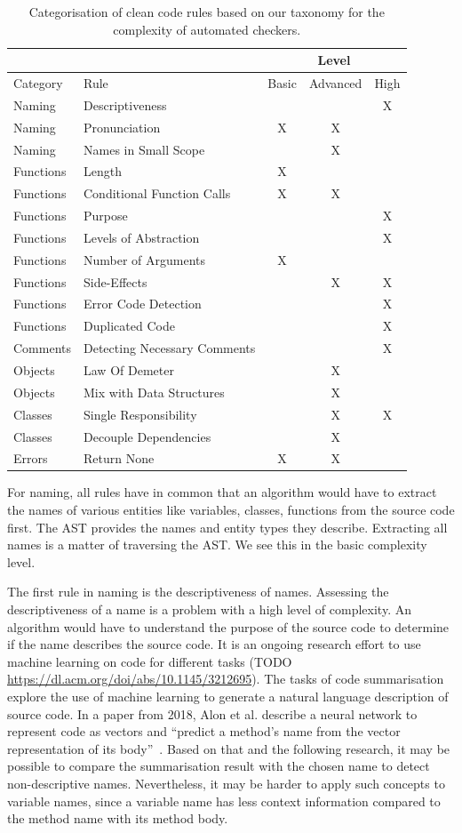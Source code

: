 \begin{table}[h]
\begin{tabularx}{\textwidth}{XXccc}
\toprule
&     & \multicolumn{3}{c}{Level} \\ \midrule
Category&Rule & Basic  & Advanced  & High \\ \midrule
Naming&Descriptiveness&&& X\\
Naming&Pronunciation&X&X& \\
Naming&Names in Small Scope&&X& \\
Functions&Length&X&&\\
Functions&Conditional Function Calls&X&X& \\
Functions&Purpose&&&X\\
Functions&Levels of Abstraction&&&X\\
Functions&Number of Arguments&X&& \\
Functions&Side-Effects&&X&X\\
Functions&Error Code Detection&&&X \\
Functions&Duplicated Code&&&X \\
Comments&Detecting Necessary Comments&&&X \\
Objects&Law Of Demeter&&X& \\
Objects&Mix with Data Structures&&X& \\
Classes&Single Responsibility&&X&X \\
Classes&Decouple Dependencies&&X& \\
Errors&Return None&X&X& \\
\bottomrule
\end{tabularx}
\caption{Categorisation of clean code rules based on our taxonomy for the complexity of automated checkers.}
\label{tab:complexity_level_overview}
\end{table}


For naming, all rules have in common that an algorithm would have to extract the names of various entities like variables, classes, functions from the source code first. The AST provides the names and entity types they describe. Extracting all names is a matter of traversing the AST. We see this in the basic complexity level.

The first rule in naming is the descriptiveness of names. Assessing the descriptiveness of a name is a problem with a high level of complexity. An algorithm would have to understand the purpose of the source code to determine if the name describes the source code. It is an ongoing research effort to use machine learning on code for different tasks (TODO \url{https://dl.acm.org/doi/abs/10.1145/3212695}). The tasks of code summarisation explore the use of machine learning to generate a natural language description of source code. In a paper from 2018, Alon et al. describe a neural network to represent code as vectors and \enquote{predict a method’s name from the vector representation of its body}~\cite{alon_code2vec_2018}. Based on that and the following research, it may be possible to compare the summarisation result with the chosen name to detect non-descriptive names. Nevertheless, it may be harder to apply such concepts to variable names, since a variable name has less context information compared to the method name with its method body.

